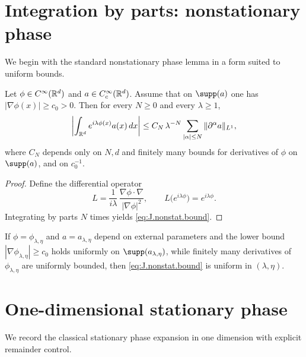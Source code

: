 \section{Integration by parts: nonstationary phase}
\label{sec:J.nsp}

We begin with the standard nonstationary phase lemma in a form suited to uniform bounds.

\begin{lemma}
\label{lem:J.nonstationary}
Let $\phi\in C^\infty(\mathbb{R}^d)$ and $a\in C_c^\infty(\mathbb{R}^d)$.
Assume that on $\supp(a)$ one has $|\nabla\phi(x)|\ge c_0>0$.
Then for every $N\ge 0$ and every $\lambda\ge 1$,
\begin{equation}\label{eq:J.nonstat.bound}
\left|\int_{\mathbb{R}^d} e^{i\lambda\phi(x)} a(x)\,dx\right|
\le
C_N\,\lambda^{-N}\sum_{|\alpha|\le N}\|\partial^\alpha a\|_{L^1},
\end{equation}
where $C_N$ depends only on $N,d$ and finitely many bounds for derivatives of $\phi$ on $\supp(a)$, and on $c_0^{-1}$.
\end{lemma}

\begin{proof}
Define the differential operator
\[
L=\frac{1}{i\lambda}\,\frac{\nabla\phi\cdot\nabla}{|\nabla\phi|^2},
\qquad
L\big(e^{i\lambda\phi}\big)=e^{i\lambda\phi}.
\]
Integrating by parts $N$ times yields \eqref{eq:J.nonstat.bound}.
\end{proof}

\begin{remark}
\label{rem:J.uniform.nsp}
If $\phi=\phi_{\lambda,\eta}$ and $a=a_{\lambda,\eta}$ depend on external parameters and the lower bound
$|\nabla\phi_{\lambda,\eta}|\ge c_0$ holds uniformly on $\supp(a_{\lambda,\eta})$, while finitely many derivatives of
$\phi_{\lambda,\eta}$ are uniformly bounded, then \eqref{eq:J.nonstat.bound} is uniform in $(\lambda,\eta)$.
\end{remark}

\section{One-dimensional stationary phase}
\label{sec:J.1d}

We record the classical stationary phase expansion in one dimension with explicit remainder control.

